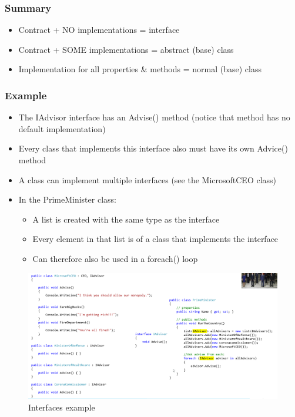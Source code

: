 \documentclass{article}
\begin{document}
\subsubsection{Summary}

\begin{itemize}
    \item Contract + NO implementations = interface
    \item Contract + SOME implementations = abstract (base) class
    \item Implementation for all properties \& methods = normal (base) class
\end{itemize}

\subsubsection{Example}

\begin{itemize}
    \item The IAdvisor interface has an Advise() method (notice that method has no default implementation)
    \item Every class that implements this interface also must have its own Advice() method
    \item A class can implement multiple interfaces (see the MicrosoftCEO class)
    \item In the PrimeMinister class:
    \begin{itemize}
        \item A list is created with the same type as the interface
        \item Every element in that list is of a class that implements the interface
        \item Can therefore also be used in a foreach() loop
    \end{itemize}
\end{itemize}

\begin{figure}[H]
    \centering
    \includegraphics[width=\textwidth]{interfaces.png}
    \caption{Interfaces example}
\end{figure}
\end{document}
